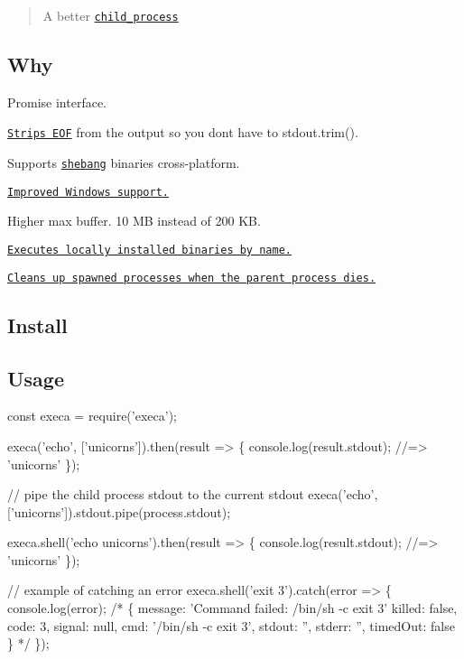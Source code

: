 \begin{quote}
A better \href{https://nodejs.org/api/child_process.html}{\tt {\ttfamily child\+\_\+process}} \end{quote}


\subsection*{Why}


\begin{DoxyItemize}
\item Promise interface.
\item \href{https://github.com/sindresorhus/strip-eof}{\tt Strips E\+OF} from the output so you don\textquotesingle{}t have to {\ttfamily stdout.\+trim()}.
\item Supports \href{https://en.wikipedia.org/wiki/Shebang_(Unix)}{\tt shebang} binaries cross-\/platform.
\item \href{https://github.com/IndigoUnited/node-cross-spawn#why}{\tt Improved Windows support.}
\item Higher max buffer. 10 MB instead of 200 KB.
\item \href{#preferlocal}{\tt Executes locally installed binaries by name.}
\item \href{#cleanup}{\tt Cleans up spawned processes when the parent process dies.}
\end{DoxyItemize}

\subsection*{Install}




\subsection*{Usage}


\begin{DoxyCode}
const execa = require('execa');

execa('echo', ['unicorns']).then(result => \{
  console.log(result.stdout);
  //=> 'unicorns'
\});

// pipe the child process stdout to the current stdout
execa('echo', ['unicorns']).stdout.pipe(process.stdout);

execa.shell('echo unicorns').then(result => \{
  console.log(result.stdout);
  //=> 'unicorns'
\});

// example of catching an error
execa.shell('exit 3').catch(error => \{
  console.log(error);
  /*
  \{
    message: 'Command failed: /bin/sh -c exit 3'
    killed: false,
    code: 3,
    signal: null,
    cmd: '/bin/sh -c exit 3',
    stdout: '',
    stderr: '',
    timedOut: false
  \}
  */
\});
\end{DoxyCode}


